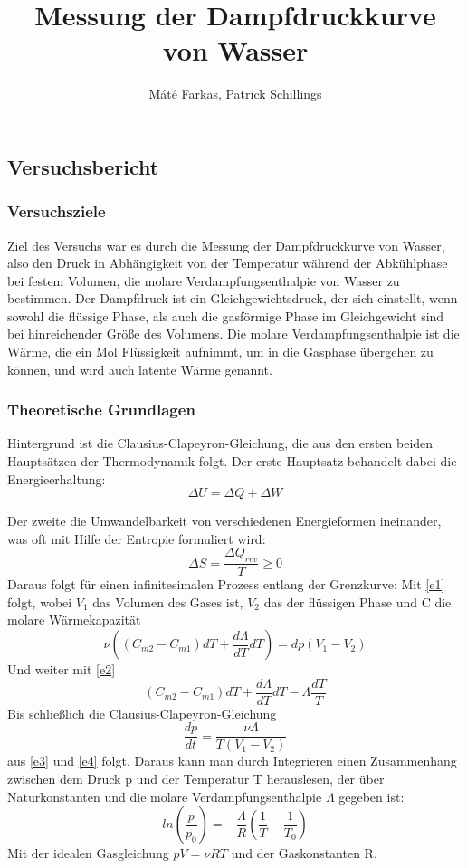\documentclass[]{article}
\title{Messung der Dampfdruckkurve von Wasser}
\author{Máté Farkas, Patrick Schillings}
\begin{document}
	\begin{center}
		\part*{Versuchsbericht}
		\newpage
	\end{center}
\tableofcontents
\section{Versuchsziele}
Ziel des Versuchs war es durch die Messung der Dampfdruckkurve von Wasser, also den Druck in Abhängigkeit von der Temperatur während der Abkühlphase bei festem Volumen, die molare Verdampfungsenthalpie von Wasser zu bestimmen. Der Dampfdruck ist ein Gleichgewichtsdruck, der sich einstellt, wenn sowohl die flüssige Phase, als auch die gasförmige Phase im Gleichgewicht sind bei hinreichender Größe des Volumens. Die molare Verdampfungsenthalpie ist die Wärme, die ein Mol Flüssigkeit aufnimmt, um in die Gasphase übergehen zu können, und wird auch latente Wärme genannt.
\section{Theoretische Grundlagen}
Hintergrund ist die Clausius-Clapeyron-Gleichung, die aus den ersten beiden Hauptsätzen der Thermodynamik folgt.
Der erste Hauptsatz behandelt dabei die Energieerhaltung:
\begin{equation}
	\Delta U =\Delta Q +\Delta W
	\label{e1}
\end{equation}

Der zweite die Umwandelbarkeit von verschiedenen Energieformen ineinander, was oft mit Hilfe der Entropie formuliert wird:
\begin{equation} 
 	 \Delta S=\frac{\Delta Q_{rev}}{T} \ge 0
 	 \label{e2}
 \end{equation}
Daraus folgt für einen infinitesimalen Prozess entlang der Grenzkurve:
Mit \ref{e1} folgt, wobei $V_1$ das Volumen des Gases ist, $V_2$ das der flüssigen Phase und C die molare Wärmekapazität
\begin{equation} 
 	 \nu((C_{m2}-C_{m1})dT+\frac{d\Lambda}{dT}dT)=dp(V_1-V_2)
 	 \label{e3} 
 \end{equation}
Und weiter mit \ref{e2}
\begin{equation} 
	(C_{m2}-C_{m1})dT+\frac{d\Lambda}{dT}dT-\Lambda\frac{dT}{T}
	\label{e4}
\end{equation}
Bis schließlich die Clausius-Clapeyron-Gleichung
\begin{equation} 
 	 \frac{dp}{dt}=\frac{\nu\Lambda}{T(V_1-V_2)} 
 \end{equation} aus \ref{e3} und \ref{e4} folgt.
Daraus kann man durch Integrieren einen Zusammenhang zwischen dem Druck p und der Temperatur T herauslesen, der über Naturkonstanten und die molare Verdampfungsenthalpie $\Lambda$ gegeben ist:
\begin{equation}
	ln(\frac{p}{p_0})=-\frac{\Lambda}{R}(\frac{1}{T}-\frac{1}{T_0})
\end{equation}
Mit der idealen Gasgleichung $pV=\nu RT$ und der Gaskonstanten R.
\end{document}

